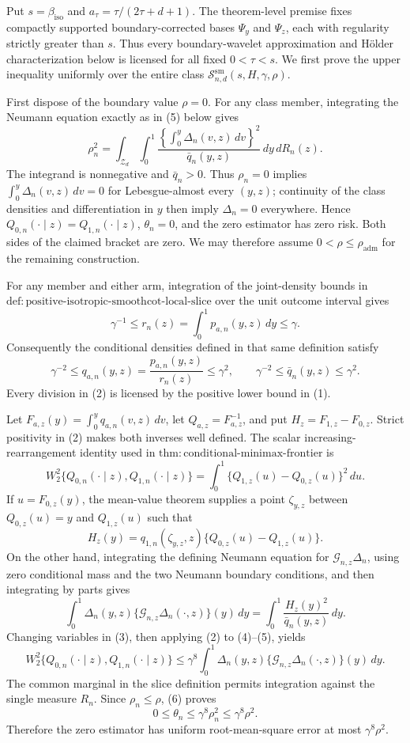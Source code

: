 Put \(s=\beta_{\mathrm{iso}}\) and \(a_\tau=\tau/(2\tau+d+1)\).  The theorem-level premise fixes compactly supported boundary-corrected bases \(\Psi_y\) and \(\Psi_z\), each with regularity strictly greater than \(s\).  Thus every boundary-wavelet approximation and H\"older characterization below is licensed for all fixed \(0<\tau<s\).  We first prove the upper inequality uniformly over the entire class \(\mathcal S^{\mathrm{sm}}_{n,d}(s,H,\gamma,\rho)\).

First dispose of the boundary value \(\rho=0\).  For any class member, integrating the Neumann equation exactly as in (5) below gives
\[
\rho_n^2=\int_{\mathcal Z_d}\int_0^1
\frac{\left\{\int_0^y\Delta_n(v,z)\,dv\right\}^2}{\bar q_n(y,z)}\,dy\,dR_n(z).
\]
The integrand is nonnegative and \(\bar q_n>0\).  Thus \(\rho_n=0\) implies \(\int_0^y\Delta_n(v,z)\,dv=0\) for Lebesgue-almost every \((y,z)\); continuity of the class densities and differentiation in \(y\) then imply \(\Delta_n=0\) everywhere.  Hence \(Q_{0,n}(\cdot\mid z)=Q_{1,n}(\cdot\mid z)\), \(\theta_n=0\), and the zero estimator has zero risk.  Both sides of the claimed bracket are zero.  We may therefore assume \(0<\rho\le\rho_{\mathrm{adm}}\) for the remaining construction.

For any member and either arm, integration of the joint-density bounds in \(\mathrm{def{:}positive\text{-}isotropic\text{-}smoothcot\text{-}local\text{-}slice}\) over the unit outcome interval gives
\[
\gamma^{-1}\le r_n(z)=\int_0^1p_{a,n}(y,z)\,dy\le\gamma. \tag{1}
\]
Consequently the conditional densities defined in that same definition satisfy
\[
\gamma^{-2}\le q_{a,n}(y,z)=\frac{p_{a,n}(y,z)}{r_n(z)}\le\gamma^2,
\qquad
\gamma^{-2}\le\bar q_n(y,z)\le\gamma^2. \tag{2}
\]
Every division in (2) is licensed by the positive lower bound in (1).

Let \(F_{a,z}(y)=\int_0^yq_{a,n}(v,z)\,dv\), let \(Q_{a,z}=F_{a,z}^{-1}\), and put \(H_z=F_{1,z}-F_{0,z}\).  Strict positivity in (2) makes both inverses well defined.  The scalar increasing-rearrangement identity used in \(\mathrm{thm{:}conditional\text{-}minimax\text{-}frontier}\) is
\[
W_2^2\{Q_{0,n}(\cdot\mid z),Q_{1,n}(\cdot\mid z)\}
=\int_0^1\{Q_{1,z}(u)-Q_{0,z}(u)\}^2\,du. \tag{3}
\]
If \(u=F_{0,z}(y)\), the mean-value theorem supplies a point \(\zeta_{y,z}\) between \(Q_{0,z}(u)=y\) and \(Q_{1,z}(u)\) such that
\[
H_z(y)=q_{1,n}(\zeta_{y,z},z)\{Q_{0,z}(u)-Q_{1,z}(u)\}. \tag{4}
\]
On the other hand, integrating the defining Neumann equation for \(\mathcal G_{n,z}\Delta_n\), using zero conditional mass and the two Neumann boundary conditions, and then integrating by parts gives
\[
\int_0^1\Delta_n(y,z)\{\mathcal G_{n,z}\Delta_n(\cdot,z)\}(y)\,dy
=\int_0^1\frac{H_z(y)^2}{\bar q_n(y,z)}\,dy. \tag{5}
\]
Changing variables in (3), then applying (2) to (4)--(5), yields
\[
W_2^2\{Q_{0,n}(\cdot\mid z),Q_{1,n}(\cdot\mid z)\}
\le\gamma^8\int_0^1\Delta_n(y,z)\{\mathcal G_{n,z}\Delta_n(\cdot,z)\}(y)\,dy. \tag{6}
\]
The common marginal in the slice definition permits integration against the single measure \(R_n\).  Since \(\rho_n\le\rho\), (6) proves
\[
0\le\theta_n\le\gamma^8\rho_n^2\le\gamma^8\rho^2. \tag{7}
\]
Therefore the zero estimator has uniform root-mean-square error at most \(\gamma^8\rho^2\).

